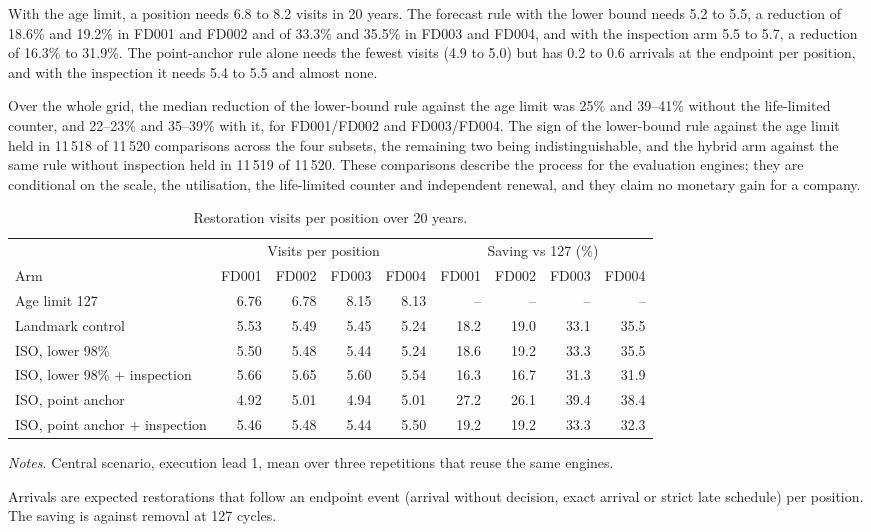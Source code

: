 \documentclass[preprint,12pt]{elsarticle}
\newcommand{\tablenotes}[1]{\par\smallskip\begin{minipage}{\linewidth}\footnotesize\raggedright\setlength{\parindent}{0pt}\setlength{\parskip}{0.35\baselineskip}\textit{Notes.} #1\end{minipage}}
\begin{document}
With the age limit, a position needs 6.8 to 8.2 visits in 20 years. The forecast rule with the lower bound needs 5.2 to 5.5, a reduction of 18.6\% and 19.2\% in FD001 and FD002 and of 33.3\% and 35.5\% in FD003 and FD004, and with the inspection arm 5.5 to 5.7, a reduction of 16.3\% to 31.9\%. The point-anchor rule alone needs the fewest visits (4.9 to 5.0) but has 0.2 to 0.6 arrivals at the endpoint per position, and with the inspection it needs 5.4 to 5.5 and almost none.

Over the whole grid, the median reduction of the lower-bound rule against the age limit was 25\% and 39--41\% without the life-limited counter, and 22--23\% and 35--39\% with it, for FD001/FD002 and FD003/FD004. The sign of the lower-bound rule against the age limit held in 11\,518 of 11\,520 comparisons across the four subsets, the remaining two being indistinguishable, and the hybrid arm against the same rule without inspection held in 11\,519 of 11\,520. These comparisons describe the process for the evaluation engines; they are conditional on the scale, the utilisation, the life-limited counter and independent renewal, and they claim no monetary gain for a company.

\begin{table}[htbp]
\centering
\caption{Restoration visits per position over 20 years.}
\label{tab:twenty}
\footnotesize
\setlength{\tabcolsep}{3pt}
\begin{tabularx}{\linewidth}{@{}Xrrrrrrrr@{}}
\toprule
 & \multicolumn{4}{c}{Visits per position} & \multicolumn{4}{c}{Saving vs 127 (\%)} \\
\cmidrule(lr){2-5}\cmidrule(lr){6-9}
Arm & FD001 & FD002 & FD003 & FD004 & FD001 & FD002 & FD003 & FD004 \\
\midrule
Age limit 127 & 6.76 & 6.78 & 8.15 & 8.13 & -- & -- & -- & -- \\
Landmark control & 5.53 & 5.49 & 5.45 & 5.24 & 18.2 & 19.0 & 33.1 & 35.5 \\
ISO, lower 98\% & 5.50 & 5.48 & 5.44 & 5.24 & 18.6 & 19.2 & 33.3 & 35.5 \\
ISO, lower 98\% + inspection & 5.66 & 5.65 & 5.60 & 5.54 & 16.3 & 16.7 & 31.3 & 31.9 \\
ISO, point anchor & 4.92 & 5.01 & 4.94 & 5.01 & 27.2 & 26.1 & 39.4 & 38.4 \\
ISO, point anchor + inspection & 5.46 & 5.48 & 5.44 & 5.50 & 19.2 & 19.2 & 33.3 & 32.3 \\
\bottomrule
\end{tabularx}
\tablenotes{Central scenario, execution lead 1, mean over three repetitions that reuse the same engines.

Arrivals are expected restorations that follow an endpoint event (arrival without decision, exact arrival or strict late schedule) per position. The saving is against removal at 127 cycles.}
\end{table}
\end{document}
